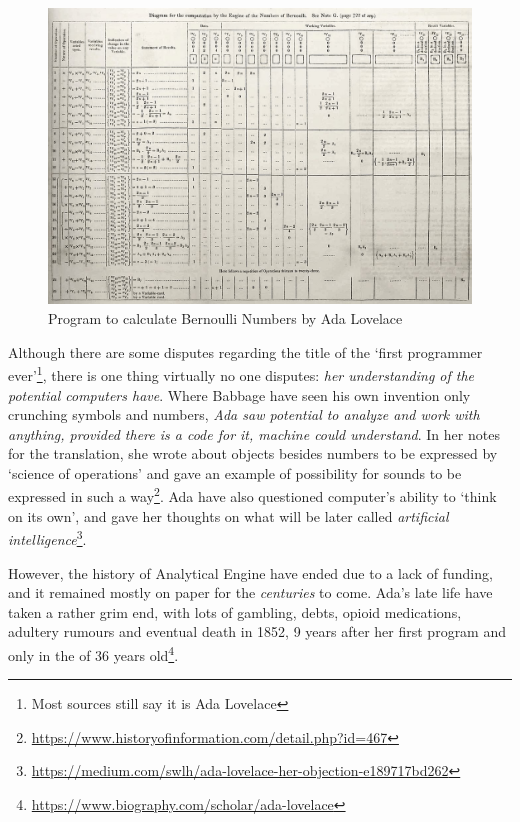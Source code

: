 \documentclass{article}
\begin{document}
            \begin{figure}
                \centering
                \includegraphics[scale=0.15]{images/misc/ada_lovelace_bernoulli_numbers_program.jpg}
                \caption{Program to calculate Bernoulli Numbers by Ada Lovelace}
            \end{figure}

            Although there are some disputes regarding the title of the `first programmer ever'\footnote{Most sources still say it is Ada Lovelace}, there is one thing virtually
            no one disputes: \emph{her understanding of the potential computers have}. Where Babbage have seen his own invention only crunching symbols and numbers, \emph{Ada saw
            potential to analyze and work with anything, provided there is a code for it, machine could understand}. In her notes for the translation, she wrote about objects besides
            numbers to be expressed by `science of operations' and gave an example of possibility for sounds to be expressed in such a way\footnote{\href{https://www.historyofinformation.com/detail.php?id=467}
            {https://www.historyofinformation.com/detail.php?id=467}}. Ada have also questioned computer's ability to `think on its own', and gave her thoughts on what will be later
            called \emph{artificial intelligence}\footnote{\href{https://medium.com/swlh/ada-lovelace-her-objection-e189717bd262}{https://medium.com/swlh/ada-lovelace-her-objection-e189717bd262}}.\par

            However, the history of Analytical Engine have ended due to a lack of funding, and it remained mostly on paper for the \emph{centuries} to come. Ada's late life 
            have taken a rather grim end, with lots of gambling, debts, opioid medications, adultery rumours and eventual death in 1852, 9 years after her first program and
            only in the of 36 years old\footnote{\href{https://www.biography.com/scholar/ada-lovelace}{https://www.biography.com/scholar/ada-lovelace}}. \par
\end{document}
